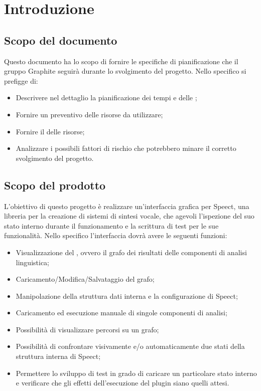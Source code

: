 \documentclass[../PianodiProgetto.tex]{subfiles}
\begin{document}
	
	\chapter{Introduzione}
	\section{Scopo del documento}
	Questo documento ha lo scopo di fornire le specifiche di pianificazione che il gruppo Graphite seguirà durante lo svolgimento del progetto. Nello specifico si prefigge di:
	
	\begin{itemize}
		\item Descrivere nel dettaglio la pianificazione dei tempi e delle ;
		\item Fornire un preventivo delle risorse da utilizzare;
		\item Fornire il  delle risorse;
		\item Analizzare i possibili fattori di rischio che potrebbero minare il corretto svolgimento del progetto.
	\end{itemize}
	
	\section{Scopo del prodotto}
	
	L'obiettivo di questo progetto è realizzare un'interfaccia grafica per Speect, una libreria per la creazione di sistemi di sintesi vocale, che agevoli l'ispezione del suo stato interno durante il funzionamento e la scrittura di test per le sue funzionalità.
	Nello specifico l'interfaccia dovrà avere le seguenti funzioni:
	\begin{itemize}
		\item Visualizzazione del , ovvero il grafo dei risultati delle componenti di analisi linguistica;
		\item Caricamento/Modifica/Salvataggio del grafo;
		\item Manipolazione della struttura dati interna e la configurazione di Speect;
		\item Caricamento ed esecuzione manuale di singole componenti di analisi;
		\item Possibilità di visualizzare percorsi su un grafo;
		\item Possibilità di confrontare visivamente e/o automaticamente due stati della struttura interna di Speect;
		\item Permettere lo sviluppo di test in grado di caricare un particolare stato interno e verificare che gli effetti dell’esecuzione del plugin siano quelli attesi.
	\end{itemize}
	
\end{document}
